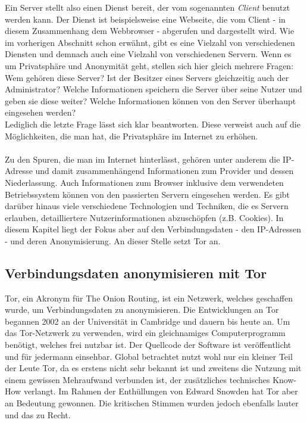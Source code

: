 Ein Server stellt also einen Dienst bereit, der vom sogenannten \textit{Client} benutzt werden kann.
Der Dienst ist beispielsweise eine Webseite, die vom Client - in diesem Zusammenhang dem Webbrowser - abgerufen und dargestellt wird.
Wie im vorherigen Abschnitt schon erwähnt, gibt es eine Vielzahl von verschiedenen Diensten und demnach auch eine Vielzahl von verschiedenen Servern.
Wenn es um Privatsphäre und Anonymität geht, stellen sich hier gleich mehrere Fragen:
Wem gehören diese Server?
Ist der Besitzer eines Servers gleichzeitig auch der Administrator?
Welche Informationen speichern die Server über seine Nutzer und geben sie diese weiter?
Welche Informationen können von den Server überhaupt eingesehen werden?
\\
Lediglich die letzte Frage lässt sich klar beantworten.
Diese verweist auch auf die Möglichkeiten, die man hat, die Privatsphäre im Internet zu erhöhen.
\\
\\
Zu den Spuren, die man im Internet hinterlässt, gehören unter anderem die IP-Adresse und damit zusammenhängend Informationen zum Provider und dessen Niederlassung.
Auch Informationen zum Browser inklusive dem verwendeten Betriebssystem können von den passierten Servern eingesehen werden.
Es gibt darüber hinaus viele verschiedene Technologien und Techniken, die es Servern erlauben, detailliertere Nutzerinformationen abzuschöpfen (z.B. Cookies).
In diesem Kapitel liegt der Fokus aber auf den Verbindungsdaten - den IP-Adressen - und deren Anonymisierung.
An dieser Stelle setzt Tor an.

\subsection{Verbindungsdaten anonymisieren mit Tor}
Tor, ein Akronym für The Onion Routing, ist ein Netzwerk, welches geschaffen wurde, um Verbindungsdaten zu anonymisieren.
Die Entwicklungen an Tor begannen 2002 an der Universität in Cambridge und dauern bis heute an. Um das Tor-Netzwerk zu verwenden, wird ein gleichnamiges Computerprogramm benötigt, welches frei nutzbar ist. Der Quellcode der Software ist veröffentlicht und für jedermann einsehbar.
Global betrachtet nutzt wohl nur ein kleiner Teil der Leute Tor, da es erstens nicht sehr bekannt ist und zweitens die Nutzung mit einem gewissen Mehraufwand verbunden ist, der zusätzliches technisches Know-How verlangt. Im Rahmen der Enthüllungen von Edward Snowden hat Tor aber an Bedeutung gewonnen. Die kritischen Stimmen wurden jedoch ebenfalls lauter und das zu Recht.

